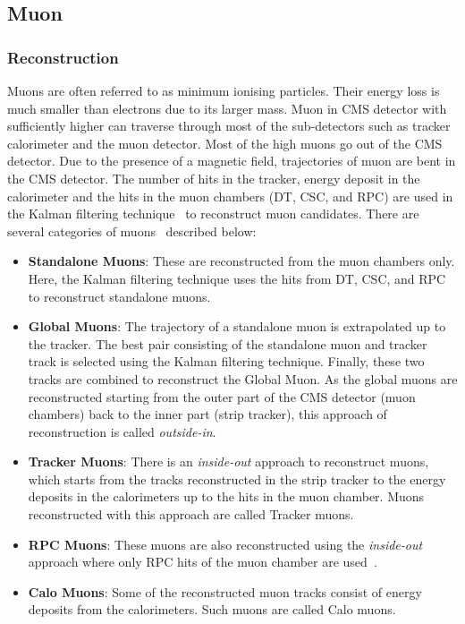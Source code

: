 \subsection{Muon}
\subsubsection{Reconstruction}
Muons are often referred to as minimum ionising particles. Their energy loss is much smaller than 
electrons due to its larger mass. Muon in CMS detector with sufficiently higher \pt can traverse through most of the sub-detectors such as tracker calorimeter and the muon 
detector. Most of the high \pt muons go out of the CMS detector. Due to the presence of a magnetic field, 
trajectories of muon are bent in the CMS detector. The number of hits in the tracker, energy deposit
in the calorimeter and the hits in the muon chambers (DT, CSC, and RPC) are used in the Kalman filtering technique~\cite{FRUHWIRTH1987444}
to reconstruct muon candidates. There are several categories of muons~\cite{Chatrchyan:2012xi} described below:
\begin{itemize}
   \item {\bf{ Standalone Muons}}: These are reconstructed from the muon chambers only. Here, the
       Kalman filtering technique uses the hits from DT, CSC, and RPC to reconstruct standalone muons.
   \item {\bf{ Global Muons}}: The trajectory of a standalone muon is extrapolated up to the tracker. 
       The best pair consisting of the standalone muon and tracker track is selected using the
       Kalman filtering technique. Finally, these two tracks are combined to reconstruct the Global Muon.
       As the global muons are reconstructed starting from the outer part of the CMS detector
       (muon chambers) back to the inner part (strip tracker), this approach of reconstruction is called 
       {\em outside-in}.
   \item {\bf{ Tracker Muons}}: There is an {\em inside-out} approach to reconstruct muons, which 
       starts from the tracks reconstructed in the strip tracker to the energy deposits in the calorimeters
       up to the hits in the muon chamber. Muons reconstructed with this approach are called Tracker muons.
   \item {\bf{ RPC Muons}}: These muons are also reconstructed using the {\em inside-out} approach 
       where only RPC hits of the muon chamber are used~\cite{Goh:2014tra}. 
   \item {\bf{ Calo Muons}}: Some of the reconstructed muon tracks consist of energy deposits
       from the calorimeters. Such muons are called Calo muons.
\end{itemize}

